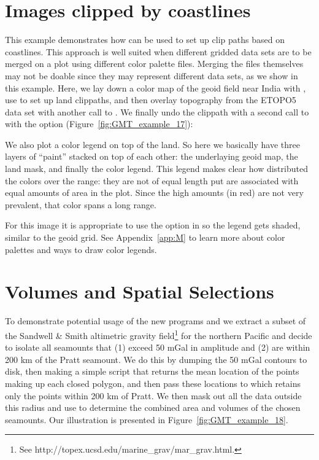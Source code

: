 

\section{Images clipped by coastlines}

This example demonstrates how  can be used
to set up clip paths based on coastlines.  This approach
is well suited when different gridded data sets are to be
merged on a plot using different color palette files.
Merging the files themselves may not be doable since they
may represent different data sets, as we show in this example.
Here, we lay down a color map of the geoid field near India
with , use  to set up land
clippaths, and then overlay topography from the ETOPO5 data
set with another call to .  We finally undo
the clippath with a second call to  with the
option  (Figure~\ref{fig:GMT_example_17}): 


We also plot a color legend on top of the land. So here we basically have three
layers of ``paint'' stacked on top of each other: the underlaying geoid map,
the land mask, and finally the color legend. This legend makes clear how
 distributed the colors over the range: they are not of equal
length put are associated with equal amounts of area in the plot. Since the high
amounts (in red) are not very prevalent, that color spans a long range.

For this image it is appropriate to use the  option in 
so the legend gets shaded, similar to the geoid grid.
See Appendix~\ref{app:M} to learn more about color palettes and ways to draw color legends.


\section{Volumes and Spatial Selections}

To demonstrate potential usage of the new programs
 and  we extract a subset
of the Sandwell \& Smith altimetric gravity field\footnote{
See http://topex.ucsd.edu/marine\_grav/mar\_grav.html.}
for the northern Pacific and decide to isolate all seamounts that
(1) exceed 50 mGal in amplitude and (2) are within 200 km
of the Pratt seamount.  We do this by dumping the 50 mGal
contours to disk, then making a simple  script
 that returns the mean location of the points
making up each closed polygon, and then pass these locations
to  which retains only the points within 200
km of Pratt.  We then mask out all the data outside this
radius and use  to determine the combined
area and volumes of the chosen seamounts.
Our illustration is presented in Figure~\ref{fig:GMT_example_18}.

